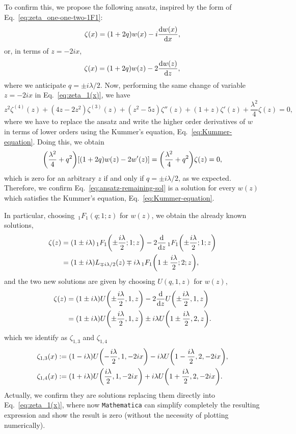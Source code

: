 \documentclass[
 aip,
 jmp,
 amsmath,amssymb,
 reprint,
 nofootinbib,
]{revtex4-2}
\begin{document}
To confirm this, we propose the following ansatz, inspired by the form of Eq.~\eqref{eq:zeta_one-one-two-1F1}:
\begin{equation}
    \zeta(x) = (1 + 2 q) w(x) - i \dv{w(x)}{x},
\end{equation}
or, in terms of $z = -2 i x$,
\begin{equation}
    \zeta(x) = (1 + 2 q) w(z) - 2 \dv{w(z)}{z},%
    \label{eq:ansatz-remaining-sol}
\end{equation}
where we anticipate $q = \pm i \lambda/2$. Now, performing the same change of variable $z = - 2 i x$ in Eq.~\eqref{eq:zeta_1(x)}, we have
\begin{equation}
    z^2 \zeta^{(4)}(z) + (4 z - 2 z^2) \zeta^{(3)}(z) + (z^2 - 5 z) \zeta''(z) + (1 + z) \zeta'(z) + \frac{\lambda^2}{4} \zeta(z) = 0, 
\end{equation} 
where we have to replace the ansatz and write the higher order derivatives of $w$ in terms of lower orders using the Kummer's equation, Eq.~\eqref{eq:Kummer-equation}. Doing this, we obtain
\begin{equation}
    \qty(\frac{\lambda^2}{4} + q^2) \qty[(1 + 2 q) w(z) - 2 w'(z)] = \qty(\frac{\lambda^2}{4} + q^2) \zeta(z) = 0,
\end{equation}
which is zero for an arbitrary $z$ if and only if $q = \pm i \lambda/2$, as we expected. Therefore, we confirm Eq.~\eqref{eq:ansatz-remaining-sol} is a solution for every $w(z)$ which satisfies the Kummer's equation, Eq.~\eqref{eq:Kummer-equation}. 

In particular, choosing $\,_1 F_1(q;1;z)$ for $w(z)$, we obtain the already known solutions,
\begin{align}
    \zeta(z) & = \qty(1 \pm i \lambda) \,_1 F_1 \qty(\pm \frac{i \lambda}{2}; 1; z) - 2 \dv{z} \,_1 F_1 \qty(\pm \frac{i \lambda}{2}; 1; z) \notag \\
    & = \qty(1 \pm i \lambda) L_{\mp i \lambda/2} (z) \mp i \lambda \, _1 F_1 \qty(1 \pm \frac{i \lambda}{2}; 2; z),
\end{align}
and the two new solutions are given by choosing $U(q,1,z)$ for $w(z)$,
\begin{align}
    \zeta(z) & = \qty(1 \pm i \lambda) U\qty(\pm \frac{i \lambda}{2}, 1, z) - 2 \dv{z} U\qty(\pm \frac{i \lambda}{2}, 1, z) \notag \\
    & = \qty(1 \pm i \lambda) U\qty(\pm \frac{i \lambda}{2}, 1, z) \pm i \lambda U\qty(1 \pm \frac{i \lambda}{2}, 2, z).
\end{align}
which we identify as $\zeta_{1,3}$ and $\zeta_{1,4}$
\begin{align}
    \zeta_{1,3}(x) & := \qty(1 - i \lambda) U\qty(- \frac{i \lambda}{2}, 1, -2 i x) - i \lambda U\qty(1 - \frac{i \lambda}{2}, 2, -2 i x), \\
    \zeta_{1,4}(x) & := \qty(1 + i \lambda) U\qty( \frac{i \lambda}{2}, 1, -2 i x) + i \lambda U\qty(1 + \frac{i \lambda}{2}, 2, -2 i x).
\end{align}
Actually, we confirm they are solutions replacing them directly into Eq.~\eqref{eq:zeta_1(x)}, where now \texttt{Mathematica} can simplify completely the resulting expression and show the result is zero (without the necessity of plotting numerically).
\end{document}
